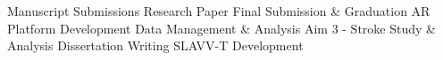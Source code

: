 \vfill{\centering{} \small{Manuscript Submissions}\hspace{1.5em} \small{Research Paper}\hspace{1.5em} \small{Final Submission \& Graduation}\hspace{1.5em} \small{AR Platform Development}\hspace{1.5em} \small{Data Management \& Analysis}\hspace{1.5em} \small{Aim 3 - Stroke Study \& Analysis}\hspace{1.5em} \small{Dissertation Writing}\hspace{1.5em} \small{SLAVV-T Development}\hspace{1.5em}\par}

